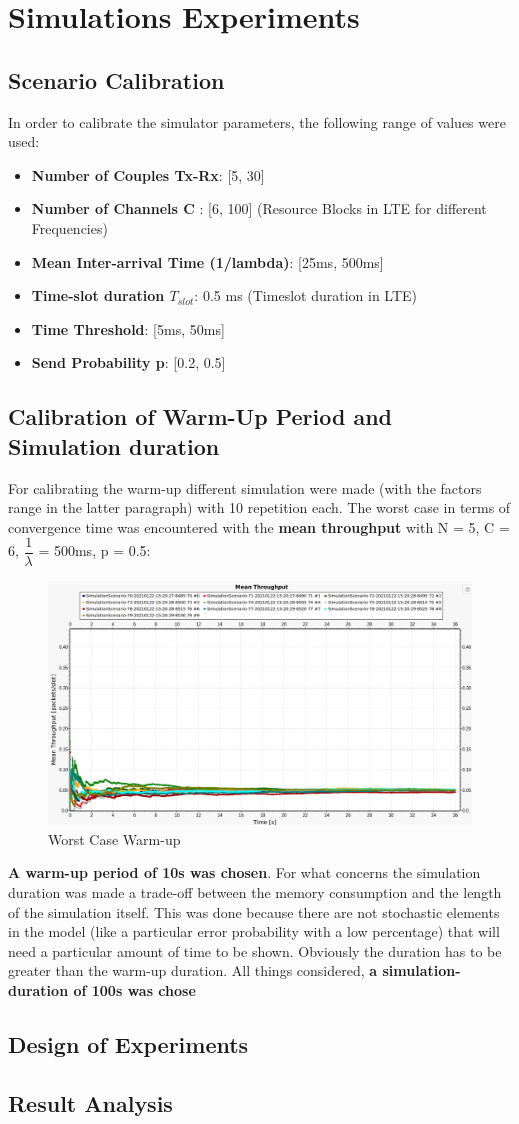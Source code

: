 \section{Simulations Experiments}
\subsection{Scenario Calibration}
In order to calibrate the simulator parameters, the following range of values were used:
\begin{itemize}
	\item \textbf{Number of Couples Tx-Rx}: [5, 30]
	\item \textbf{Number of Channels C} : [6, 100] (Resource Blocks in LTE for different Frequencies)
	\item \textbf{Mean Inter-arrival Time (1/lambda)}: [25ms, 500ms]   
	\item \textbf{Time-slot duration $T_{slot}$}: 0.5 ms (Timeslot duration in LTE)
	\item \textbf{Time Threshold}: [5ms, 50ms] 
	\item \textbf{Send Probability p}: [0.2, 0.5] 
\end{itemize}

\subsection{Calibration of Warm-Up Period and Simulation duration}
For calibrating the warm-up different simulation were made (with the factors range in the latter paragraph) with 10 repetition each. 
The worst case in terms of convergence time was encountered with the \textbf{mean throughput} with N = 5, C = 6, $\dfrac{1}{\lambda}$ = 500ms, p = 0.5:
\begin{figure}[H]
	\centering
	\includegraphics[width=\textwidth]{img/WorstCaseWarmUp.png}
	\caption{Worst Case Warm-up}
	\label {img: warmUp}
\end{figure}  
\noindent\textbf{A warm-up period of 10s was chosen}.
For what concerns the simulation duration was made a trade-off between the memory consumption and the length of the simulation itself. This was done because there are not stochastic elements in the model (like a particular error probability with a low percentage) that will need a particular amount of time to be shown. Obviously the duration has to be greater than the warm-up duration. All things considered, \textbf{a simulation-duration of 100s was chose}

\subsection{Design of Experiments}
\subsection{Result Analysis}